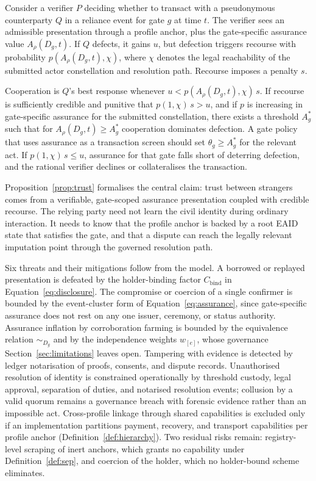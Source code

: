 \documentclass[oneside,10pt]{swissi}
\begin{document}
Consider a verifier $P$ deciding whether to transact with a pseudonymous counterparty $Q$ in a reliance event for gate $g$ at time $t$. The verifier sees an admissible presentation through a profile anchor, plus the gate-specific assurance value $A_\rho(D_g,t)$. If $Q$ defects, it gains $u$, but defection triggers recourse with probability $p(A_\rho(D_g,t),\chi)$, where $\chi$ denotes the legal reachability of the submitted actor constellation and resolution path. Recourse imposes a penalty $s$.

\begin{proposition}
\label{prop:trust}
Cooperation is $Q$'s best response whenever $u < p(A_\rho(D_g,t),\chi)\, s$. If recourse is sufficiently credible and punitive that $p(1,\chi)\, s > u$, and if $p$ is increasing in gate-specific assurance for the submitted constellation, there exists a threshold $A^\ast_g$ such that for $A_\rho(D_g,t) \ge A^\ast_g$ cooperation dominates defection. A gate policy that uses assurance as a transaction screen should set $\theta_g \ge A^\ast_g$ for the relevant act. If $p(1,\chi)\, s \le u$, assurance for that gate falls short of deterring defection, and the rational verifier declines or collateralises the transaction.
\end{proposition}

Proposition~\ref{prop:trust} formalises the central claim: trust between strangers comes from a verifiable, gate-scoped assurance presentation coupled with credible recourse. The relying party need not learn the civil identity during ordinary interaction. It needs to know that the profile anchor is backed by a root EAID state that satisfies the gate, and that a dispute can reach the legally relevant imputation point through the governed resolution path.

Six threats and their mitigations follow from the model. A borrowed or replayed presentation is defeated by the holder-binding factor $C_{\text{bind}}$ in Equation~\eqref{eq:disclosure}. The compromise or coercion of a single confirmer is bounded by the event-cluster form of Equation~\eqref{eq:assurance}, since gate-specific assurance does not rest on any one issuer, ceremony, or status authority. Assurance inflation by corroboration farming is bounded by the equivalence relation $\sim_{D_g}$ and by the independence weights $w_{[e]}$, whose governance Section~\ref{sec:limitations} leaves open. Tampering with evidence is detected by ledger notarisation of proofs, consents, and dispute records. Unauthorised resolution of identity is constrained operationally by threshold custody, legal approval, separation of duties, and notarised resolution events; collusion by a valid quorum remains a governance breach with forensic evidence rather than an impossible act. Cross-profile linkage through shared capabilities is excluded only if an implementation partitions payment, recovery, and transport capabilities per profile anchor (Definition~\ref{def:hierarchy}). Two residual risks remain: registry-level scraping of inert anchors, which grants no capability under Definition~\ref{def:sep}, and coercion of the holder, which no holder-bound scheme eliminates.
\end{document}

